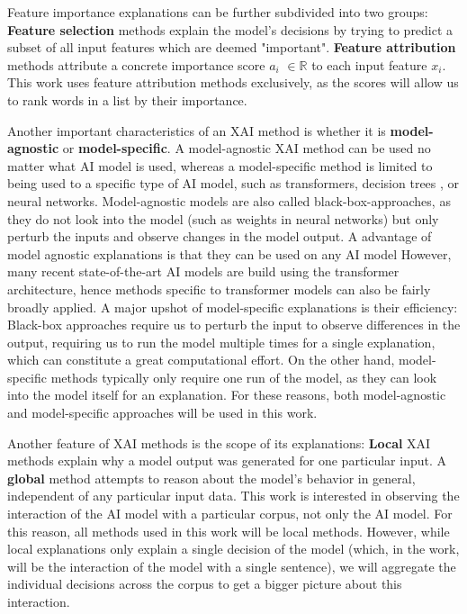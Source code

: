 Feature importance explanations can be further subdivided into two groups:
\textbf{Feature selection} methods explain the model's decisions by trying to predict a subset of all input features which are deemed "important".
\textbf{Feature attribution} methods attribute a concrete importance score $a_i$ $\in \mathbb{R}$ to each input feature $x_i$.
This work uses feature attribution methods exclusively, as the scores will allow us to rank words in a list by their importance.

Another important characteristics of an XAI method is whether it is \textbf{model-agnostic} or \textbf{model-specific}.
A model-agnostic XAI method can be used no matter what AI model is used, whereas a model-specific method is limited to being used to a specific type of AI model, such as transformers, decision trees , or neural networks.
Model-agnostic models are also called black-box-approaches, as they do not look into the model (such as weights in neural networks) but only perturb the inputs and observe changes in the model output.
A advantage of model agnostic explanations is that they can be used on any AI model
However, many recent state-of-the-art AI models are build using the transformer architecture, hence methods specific to transformer models can also be fairly broadly applied.
A major upshot of model-specific explanations is their efficiency:
Black-box approaches require us to perturb the input to observe differences in the output, requiring us to run the model multiple times for a single explanation, which can constitute a great computational effort.
On the other hand, model-specific methods typically only require one run of the model, as they can look into the model itself for an explanation.
For these reasons, both model-agnostic and model-specific approaches will be used in this work.

Another feature of XAI methods is the scope of its explanations:
\textbf{Local} XAI methods explain why a model output was generated for one particular input.
A \textbf{global} method attempts to reason about the model's behavior in general, independent of any particular input data.
This work is interested in observing the interaction of the AI model with a particular corpus, not only the AI model.
For this reason, all methods used in this work will be local methods.
However, while local explanations only explain a single decision of the model (which, in the work, will be the interaction of the model with a single sentence), we will aggregate the individual decisions across the corpus to get a bigger picture about this interaction.

